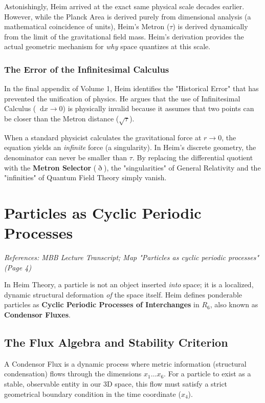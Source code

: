 \documentclass[11pt,a4paper,oneside]{article}
\newcommand{\ethop}{\eth}
\newcommand{\diff}{\mathop{}\!\mathrm{d}} %
\begin{document}
Astonishingly, Heim arrived at the exact same physical scale decades earlier. However, while the Planck Area is derived purely from dimensional analysis (a mathematical coincidence of units), Heim's Metron ($\tau$) is derived dynamically from the limit of the gravitational field mass. Heim's derivation provides the actual geometric mechanism for \textit{why} space quantizes at this scale.

\subsubsection{The Error of the Infinitesimal Calculus}
In the final appendix of Volume 1, Heim identifies the "Historical Error" that has prevented the unification of physics. He argues that the use of Infinitesimal Calculus ($\diff x \to 0$) is physically invalid because it assumes that two points can be closer than the Metron distance ($\sqrt{\tau}$).

When a standard physicist calculates the gravitational force at $r \to 0$, the equation yields an \textit{infinite} force (a singularity). In Heim's discrete geometry, the denominator can never be smaller than $\tau$. By replacing the differential quotient with the \textbf{Metron Selector} ($\ethop$), the "singularities" of General Relativity and the "infinities" of Quantum Field Theory simply vanish.


\section{Particles as Cyclic Periodic Processes}
\label{sec:particle_dynamics}

\textit{References: MBB Lecture Transcript; Map "Particles as cyclic periodic processes" (Page 4)}

In Heim Theory, a particle is not an object inserted \textit{into} space; it is a localized, dynamic structural deformation \textit{of} the space itself. Heim defines ponderable particles as \textbf{Cyclic Periodic Processes of Interchanges} in $R_6$, also known as \textbf{Condensor Fluxes}.

\subsection{The Flux Algebra and Stability Criterion}
A Condensor Flux is a dynamic process where metric information (structural condensation) flows through the dimensions $x_1 \dots x_6$. For a particle to exist as a stable, observable entity in our 3D space, this flow must satisfy a strict geometrical boundary condition in the time coordinate ($x_4$).
\end{document}
